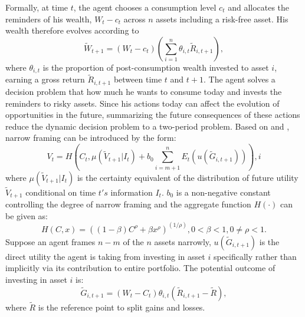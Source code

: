 \documentclass[ukenglish,nottitlepage,thmsb,11pt,letterpaper]{article}
\begin{document}
Formally, at time $t$, the agent chooses a consumption level $c_{t}$ and allocates the reminders of his wealth, $W_t - c_t$ across $n$ assets including a risk-free asset. His wealth therefore evolves according to
\begin{equation}
\widetilde{W}_{t+1} = (W_t-c_t)\left( \sum_{i=1}^{n} \theta_{i,t} \widetilde{R}_{i,t+1}  \right),
\end{equation}            
where $\theta_{i,t}$ is the proportion of post-consumption wealth invested to asset $i$, earning a gross return $\widetilde{R}_{i, t+1}$ between time $t$ and $t+1$.  The agent solves a decision problem that how much he wants to consume today and invests the reminders to risky assets. Since his actions today can affect the evolution of opportunities in the future, summarizing the future consequences of these actions reduce the dynamic decision problem to a two-period problem. Based on \citet{Barberis2006} and \citet{Barberis2009}, narrow framing can be introduced by the form:
\begin{equation}
V_t = H \left( C_t, \mu(\widetilde{V}_{t+1}\vert{I_t}) + b_0 \sum_{i = m+1}^{n}E_t ( u(\widetilde{G}_{i,t+1}) ) \right),i
\end{equation}
where $\mu(\widetilde{V}_{t+1}\vert{I_t})$ is the certainty equivalent of the distribution of future utility $\widetilde{V}_{t+1}$ conditional on time $t's$ information $I_t$. $b_0$ is a non-negative constant controlling the degree of narrow framing and the aggregate function $H(\cdot)$ can be given as:
\begin{equation}
H(C,x) = \left( (1-\beta)C^\rho + \beta x^\rho \right)^ {(1/\rho)}, 0<\beta<1, 0\neq\rho<1.
\end{equation}
Suppose an agent frames $n-m$ of the $n$ assets narrowly, $u(\widetilde{G}_{i,t+1})$ is the direct utility the agent is taking from investing in asset $i$ specifically rather than implicitly via its contribution to entire portfolio. The potential outcome of investing in asset $i$ is:  \begin{equation}
\widetilde{G}_{i,t+1} = (W_t - C_t) \theta_{i,t} \left( \widetilde{R}_{i,t+1}-\widetilde{R} \right),
\end{equation}
where $\widetilde{R}$ is the reference point to split gains and losses. 
\end{document}
